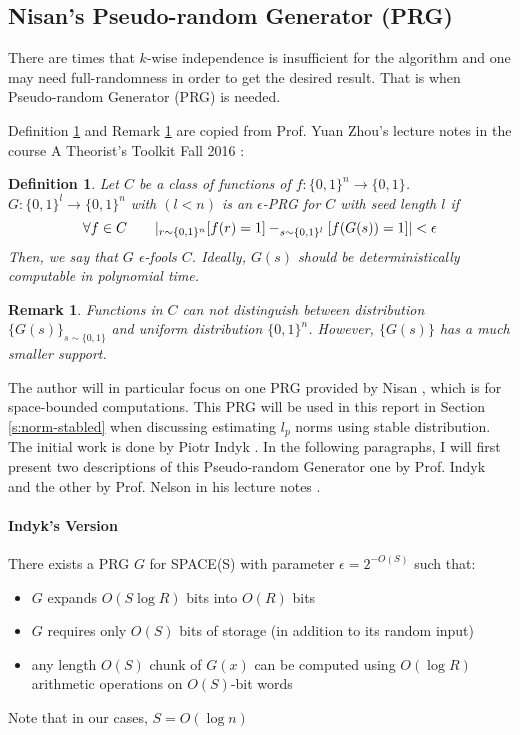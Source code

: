 \documentclass[11pt]{article}
\theoremstyle{plain}
\newtheorem{definition}[theorem]{Definition}
\newtheorem{remark}[theorem]{Remark}
\let\Pr\relax
\DeclareMathOperator*{\Pr}{\mathbb{P}}
\begin{document}
\subsection{Nisan's Pseudo-random Generator (PRG)}

There are times that $k$-wise independence is insufficient for the algorithm 
and one may need full-randomness in order to get the desired result. That is 
when Pseudo-random Generator (PRG) is needed. 

Definition  \ref{def:prg} and Remark  \ref{re:prg} are copied from Prof. Yuan 
Zhou's lecture notes in the course A Theorist’s Toolkit Fall 
2016  \cite{Zhou-theory}:

\begin{definition}
\label{def:prg}
Let $C$ be a class of functions of $f : \{0, 1\}^n \rightarrow \{0, 1\}$.  
$G : \{0, 1\}^l \rightarrow \{0, 1\}^n$ with $(l < n)$ is an $\epsilon$-PRG for 
$C$ with seed length $l$ if
\[
\forall f\in C \qquad |\Pr_{r\sim\{0,1\}^n}[f(r)=1] -  
\Pr_{s\sim\{0,1\}^l}[f(G(s))=1]|<\epsilon 
\]
Then, we say that $G$ $\epsilon$-fools $C$.  Ideally, $G(s)$ should be 
deterministically computable in polynomial
time.
\end{definition}
\begin{remark}
\label{re:prg}
	Functions in $C$ can not distinguish between distribution 
	$\{G(s)\}_{s\sim\{0,1\}}$ and uniform distribution $\{0, 1\}^n$. However, 
	$\{G(s)\} $ has a much smaller support. 
\end{remark}

The author will in particular focus on one PRG provided by 
Nisan  \cite{Nisan1990-prg}, which is for space-bounded computations. This 
PRG will be used in this report in Section  \ref{s:norm-stabled} when 
discussing estimating $l_p$ norms using stable distribution. The initial work 
is done by Piotr Indyk  \cite{Indyk2006-prg}. In the following paragraphs, I 
will first present two descriptions of this Pseudo-random Generator one by 
Prof. Indyk and the other by Prof. Nelson in his lecture 
notes  \cite{Nel2015-web}.

\paragraph{Indyk's Version}
There exists a PRG $G$ for SPACE(S) with parameter $\epsilon=2^{−O(S)}$ 
such that:
\begin{itemize}
	\item $G$ expands $O(S \log R)$ bits into $O(R)$ bits
	\item $G$ requires only $O(S)$ bits of storage (in addition to its random 
	input)
	\item any length $O(S)$ chunk of $G(x)$ can be computed using $O(\log 
	R)$ arithmetic 	operations on $O(S)$-bit words
\end{itemize}
Note that in our cases, $S=O(\log n)$
\end{document}
